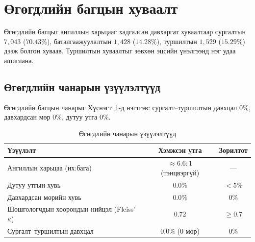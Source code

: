 \section{Өгөгдлийн багцын хуваалт}

Өгөгдлийн багцыг ангиллын харьцааг хадгалсан давхаргат хуваалтаар сургалтын
$7{,}043$ ($70.43\%$), баталгаажуулалтын $1{,}428$ ($14.28\%$), туршилтын
$1{,}529$ ($15.29\%$) дээж болгон хуваав.
Туршилтын хуваалтыг зөвхөн эцсийн үнэлгээнд нэг удаа ашиглана.

\begin{table}[H]
\centering
\caption{Өгөгдлийн багц дахь ангилал тус бүрийн дээжийн тоо}
\label{tab:data-stats}
\end{table}

\subsection{Өгөгдлийн чанарын үзүүлэлтүүд}

Өгөгдлийн багцын чанарыг Хүснэгт~\ref{tab:data-quality}-д нэгтгэв:
сургалт--туршилтын давхцал $0\%$, давхардсан мөр $0\%$, дутуу утга $0\%$.

\begin{table}[H]
\centering
\caption{Өгөгдлийн чанарын үзүүлэлтүүд}
\label{tab:data-quality}
\begin{tabular}{@{}lcc@{}}
\toprule
\textbf{Үзүүлэлт} & \textbf{Хэмжсэн утга} & \textbf{Зорилтот} \\
\midrule
Ангиллын харьцаа (их:бага)        & $\approx 6.6{:}1$ (тэнцвэргүй) & --- \\
Дутуу утгын хувь                  & $0.0\%$ & $<5\%$ \\
Давхардсан мөрийн хувь            & $0.0\%$ & $0\%$ \\
Шошгологчдын хоорондын нийцэл (Fleiss' $\kappa$)& $0.72$ & $\geq 0.7$ \\
Сургалт--туршилтын давхцал        & $0.0\%$ ($0$ мөр) & $0\%$ \\
\bottomrule
\end{tabular}
\end{table}

